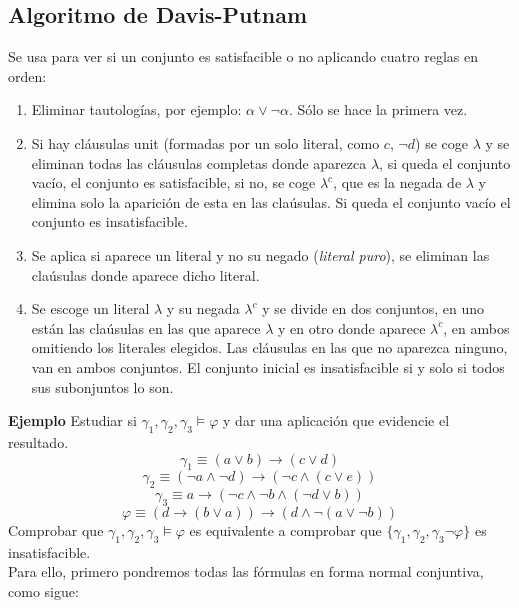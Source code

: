 \documentclass[a4paper]{article}
\begin{document}
\subsection{Algoritmo de Davis-Putnam}
Se usa para ver si un conjunto es satisfacible o no aplicando cuatro reglas en orden:
\begin{enumerate}[I]
\item Eliminar tautologías, por ejemplo: $\alpha\lor\neg\alpha$. Sólo se hace la primera vez.
\item Si hay cláusulas unit (formadas por un solo literal, como $c$, $\neg d$) se coge $\lambda$ y se eliminan todas las cláusulas completas donde aparezca $\lambda$, si queda el conjunto vacío, el conjunto es satisfacible, si no, se coge $\lambda^c$, que es la negada de $\lambda$ y elimina solo la aparición de esta en las claúsulas. Si queda el conjunto vacío el conjunto es insatisfacible.
\item Se aplica si aparece un literal y no su negado (\emph{literal puro}), se eliminan las claúsulas donde aparece dicho literal.
\item Se escoge un literal $\lambda$ y su negada $\lambda^c$ y se divide en dos conjuntos, en uno están las claúsulas en las que aparece $\lambda$ y en otro donde aparece $\lambda^c$, en ambos omitiendo los literales elegidos. Las cláusulas en las que no aparezca ninguno, van en ambos conjuntos. El conjunto inicial es insatisfacible si y solo si todos sus subonjuntos lo son.
\end{enumerate}

\large{\textbf{Ejemplo}}
Estudiar si $\gamma_1,\gamma_2,\gamma_3\models\varphi$ y dar una aplicación que evidencie el resultado.
$$\gamma_1\equiv(a\lor b)\rightarrow(c\lor d)$$
$$\gamma_2\equiv(\neg a\land\neg d)\rightarrow(\neg c\land(c\lor e))$$
$$\gamma_3\equiv a \rightarrow(\neg c\land\neg b\land(\neg d\lor b))$$
$$\varphi\equiv(d\rightarrow(b\lor a))\rightarrow(d\land\neg(a\lor\neg b))$$
Comprobar que $\gamma_1,\gamma_2,\gamma_3\models\varphi$ es equivalente a comprobar que $\{\gamma_1,\gamma_2,\gamma_3\neg\varphi\}$ es insatisfacible.\\
Para ello, primero pondremos todas las fórmulas en forma normal conjuntiva, como sigue:

\end{document}
